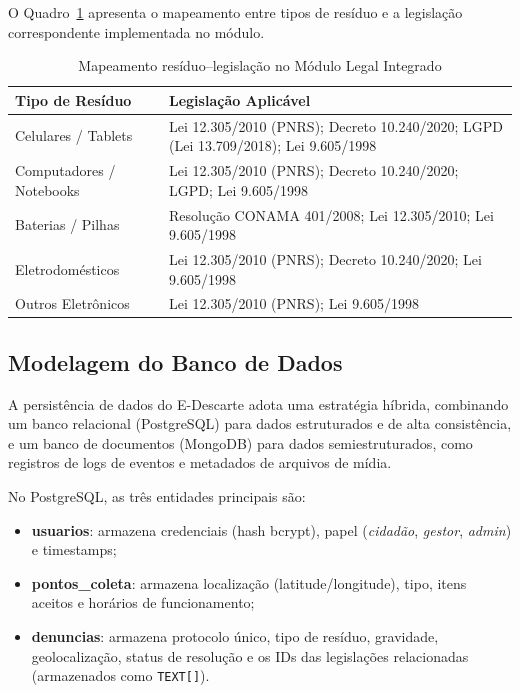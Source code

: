 \documentclass[12pt, a4paper]{article}
\numberwithin{equation}{section}
\numberwithin{figure}{section}
\numberwithin{table}{section}
\begin{document}
O Quadro~\ref{quad:legislacao} apresenta o mapeamento entre tipos de resíduo
e a legislação correspondente implementada no módulo.

\begin{table}[H]
  \centering
  \caption{Mapeamento resíduo--legislação no Módulo Legal Integrado}
  \label{quad:legislacao}
  \begin{tabularx}{\textwidth}{|l|X|}
    \hline
    \textbf{Tipo de Resíduo} & \textbf{Legislação Aplicável} \\
    \hline
    Celulares / Tablets &
      Lei 12.305/2010 (PNRS); Decreto 10.240/2020; LGPD (Lei 13.709/2018);
      Lei 9.605/1998 \\
    \hline
    Computadores / Notebooks &
      Lei 12.305/2010 (PNRS); Decreto 10.240/2020; LGPD; Lei 9.605/1998 \\
    \hline
    Baterias / Pilhas &
      Resolução CONAMA 401/2008; Lei 12.305/2010; Lei 9.605/1998 \\
    \hline
    Eletrodomésticos &
      Lei 12.305/2010 (PNRS); Decreto 10.240/2020; Lei 9.605/1998 \\
    \hline
    Outros Eletrônicos &
      Lei 12.305/2010 (PNRS); Lei 9.605/1998 \\
    \hline
  \end{tabularx}
\end{table}

\subsection{Modelagem do Banco de Dados}

A persistência de dados do E-Descarte adota uma estratégia híbrida, combinando
um banco relacional (PostgreSQL) para dados estruturados e de alta consistência,
e um banco de documentos (MongoDB) para dados semiestruturados, como registros
de logs de eventos e metadados de arquivos de mídia.

No PostgreSQL, as três entidades principais são:

\begin{itemize}
  \item \textbf{usuarios}: armazena credenciais (hash bcrypt), papel
        (\textit{cidadão}, \textit{gestor}, \textit{admin}) e timestamps;
  \item \textbf{pontos\_coleta}: armazena localização (latitude/longitude),
        tipo, itens aceitos e horários de funcionamento;
  \item \textbf{denuncias}: armazena protocolo único, tipo de resíduo,
        gravidade, geolocalização, status de resolução e os IDs das
        legislações relacionadas (armazenados como \texttt{TEXT[]}).
\end{itemize}
\end{document}
